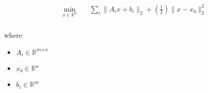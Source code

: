 \documentclass[12pt]{article}
\begin{document}
\begin{align*}
 & \begin{aligned} \min_{\textit{x} \in \mathbb{R}^{ \textit{n}}} \quad & \sum_\textit{i} \|\textit{A}_{ \textit{i} }\textit{x} + \textit{b}_{ \textit{i} }\|_2 + \left( \frac{1}{2} \right)\|\textit{x} - \textit{x₀}\|_2^{2} \\
\end{aligned}
\end{align*}

where
\begin{itemize}
\item $\textit{A}_{\textit{i}} \in \mathbb{R}^{ \textit{m} \times \textit{n} }$
\item $\textit{x₀} \in \mathbb{R}^{ \textit{n}}$
\item $\textit{b}_{\textit{i}} \in \mathbb{R}^{ \textit{m}}$
\end{itemize}
\end{document}
